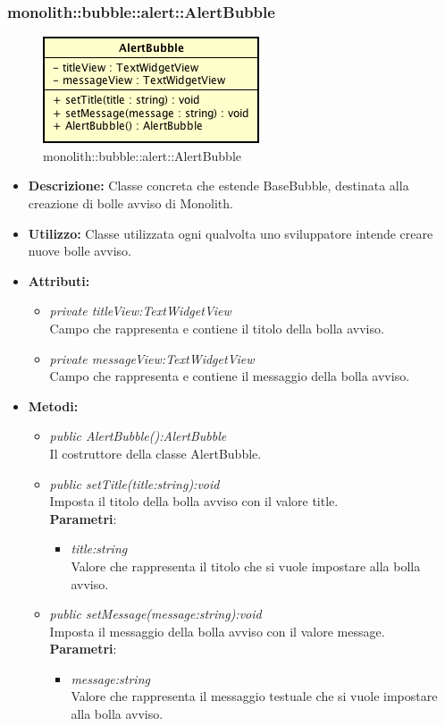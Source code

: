 \subsubsection{monolith::bubble::alert::AlertBubble}

\label{monolith::bubble::alert::AlertBubble}
\begin{figure}[ht]
	\centering
	\includegraphics[scale=0.5]{Sezioni/SottosezioniST/img/AlertBubble.png}
	\caption{monolith::bubble::alert::AlertBubble}
\end{figure}

\begin{itemize}
\item \textbf{Descrizione:} Classe concreta che estende BaseBubble, destinata alla creazione di bolle avviso di Monolith.
\item \textbf{Utilizzo:} Classe utilizzata ogni qualvolta uno sviluppatore intende creare nuove bolle avviso.
\item \textbf{Attributi:} 
\begin{itemize}
\item \textit{private titleView:TextWidgetView}\\
Campo che rappresenta e contiene il titolo della bolla avviso.
\item \textit{private messageView:TextWidgetView}\\
Campo che rappresenta e contiene il messaggio della bolla avviso.
\end{itemize}
\item \textbf{Metodi:}
\begin{itemize}
\item \textit{public AlertBubble():AlertBubble}\\
Il costruttore della classe AlertBubble.
\item \textit{public setTitle(title:string):void}\\
Imposta il titolo della bolla avviso con il valore title.
\\ \textbf{Parametri}: \begin{itemize}
\item \textit{title:string}\\
Valore che rappresenta il titolo che si vuole impostare alla bolla avviso.
\end{itemize}
\item \textit{public setMessage(message:string):void}\\
Imposta il messaggio della bolla avviso con il valore message.
\\ \textbf{Parametri}: \begin{itemize}
\item \textit{message:string}\\
Valore che rappresenta il messaggio testuale che si vuole impostare alla bolla avviso.
\end{itemize}
\end{itemize}
\end{itemize}